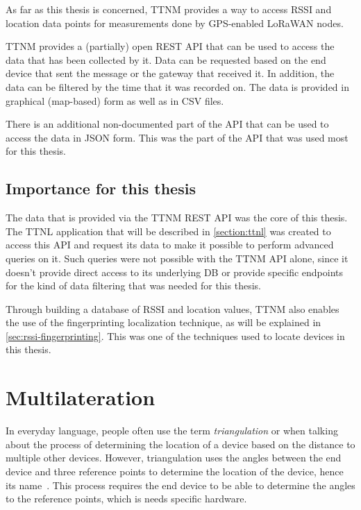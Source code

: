As far as this thesis is concerned, \acl{TTNM} provides a way to access \ac{RSSI} and location data points for measurements done by \ac{GPS}-enabled \ac{LoRaWAN} nodes.

\ac{TTNM} provides a (partially) open \ac{REST} \ac{API} that can be used to access the data that has been collected by it.
Data can be requested based on the end device that sent the message or the gateway that received it.
In addition, the data can be filtered by the time that it was recorded on.
The data is provided in graphical (map-based) form as well as in \ac{CSV} files.

There is an additional non-documented part of the \ac{API} that can be used to access the data in \ac{JSON} form.
This was the part of the \ac{API} that was used most for this thesis.

\subsection{Importance for this thesis}\label{sec:ttn-mapper-importance}

The data that is provided via the \ac{TTNM} \ac{REST} \ac{API} was the core of this thesis.
The \ac{TTNL} application that will be described in \cref{section:ttnl} was created to access this \ac{API} and request its data to make it possible to perform advanced queries on it.
Such queries were not possible with the \ac{TTNM} \ac{API} alone, since it doesn't provide direct access to its underlying \ac{DB} or provide specific endpoints for the kind of data filtering that was needed for this thesis.

Through building a database of \ac{RSSI} and location values, \ac{TTNM} also enables the use of the fingerprinting localization technique, as will be explained in \cref{sec:rssi-fingerprinting}.
This was one of the techniques used to locate devices in this thesis.

\section{Multilateration}\label{sec:multilateration-basics}

In everyday language, people often use the term \emph{triangulation} or when talking about the process of determining the location of a device based on the distance to multiple other devices.
However, triangulation uses the angles between the end device and three reference points to determine the location of the device, hence its name~\cite{yaro_multiangulation_2017}.
This process requires the end device to be able to determine the angles to the reference points, which is needs specific hardware.

